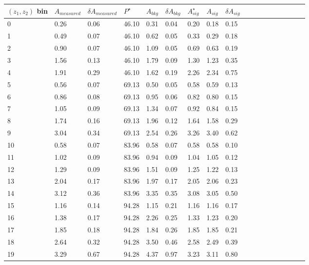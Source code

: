 \begin{table}[H]\footnotesize
\centering
\begin{tabular}{|l|l|l|l|l|l|l|l|l|l|l|l|l|l|l|l|l|l|}
\\ \hline
$(z_1,z_2)$ bin & $A_{measured}$ & $\delta A_{measured}$ & $P^{\star}$ &  $A_{bkg}$ & $\delta A_{bkg}$ & $A_{sig}^{\star}$ & $ A_{sig}$  & $\delta A_{sig}$ \\ \hline
0 & 0.26 & 0.06 & 46.10 & 0.31 & 0.04 & 0.20 & 0.18 & 0.15 \\ \hline 
1 & 0.49 & 0.07 & 46.10 & 0.62 & 0.05 & 0.33 & 0.29 & 0.18 \\ \hline 
2 & 0.90 & 0.07 & 46.10 & 1.09 & 0.05 & 0.69 & 0.63 & 0.19 \\ \hline 
3 & 1.56 & 0.13 & 46.10 & 1.79 & 0.09 & 1.30 & 1.23 & 0.35 \\ \hline 
4 & 1.91 & 0.29 & 46.10 & 1.62 & 0.19 & 2.26 & 2.34 & 0.75 \\ \hline 
5 & 0.56 & 0.07 & 69.13 & 0.50 & 0.05 & 0.58 & 0.59 & 0.13 \\ \hline 
6 & 0.86 & 0.08 & 69.13 & 0.95 & 0.06 & 0.82 & 0.80 & 0.15 \\ \hline 
7 & 1.05 & 0.09 & 69.13 & 1.34 & 0.07 & 0.92 & 0.84 & 0.15 \\ \hline 
8 & 1.74 & 0.16 & 69.13 & 1.96 & 0.12 & 1.64 & 1.58 & 0.29 \\ \hline 
9 & 3.04 & 0.34 & 69.13 & 2.54 & 0.26 & 3.26 & 3.40 & 0.62 \\ \hline 
10 & 0.58 & 0.07 & 83.96 & 0.58 & 0.07 & 0.58 & 0.58 & 0.10 \\ \hline 
11 & 1.02 & 0.09 & 83.96 & 0.94 & 0.09 & 1.04 & 1.05 & 0.12 \\ \hline 
12 & 1.29 & 0.09 & 83.96 & 1.51 & 0.09 & 1.25 & 1.22 & 0.13 \\ \hline 
13 & 2.04 & 0.17 & 83.96 & 1.97 & 0.17 & 2.05 & 2.06 & 0.23 \\ \hline 
14 & 3.12 & 0.36 & 83.96 & 3.35 & 0.35 & 3.08 & 3.05 & 0.50 \\ \hline 
15 & 1.16 & 0.14 & 94.28 & 1.15 & 0.21 & 1.16 & 1.16 & 0.17 \\ \hline 
16 & 1.38 & 0.17 & 94.28 & 2.26 & 0.25 & 1.33 & 1.23 & 0.20 \\ \hline 
17 & 1.85 & 0.18 & 94.28 & 1.84 & 0.26 & 1.85 & 1.85 & 0.21 \\ \hline 
18 & 2.64 & 0.32 & 94.28 & 3.50 & 0.46 & 2.58 & 2.49 & 0.39 \\ \hline 
19 & 3.29 & 0.67 & 94.28 & 4.37 & 0.97 & 3.23 & 3.11 & 0.80 \\ \hline 

\end{tabular}
\end{table}
